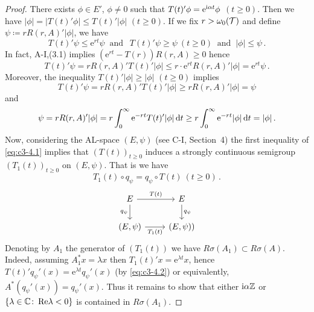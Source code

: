 \begin{proof}
	There exists $\phi \in E'$, $\phi \neq 0$ such that $T(t)'\phi = \mathrm{e}^{\mathrm{i}\alpha t}\phi$ $(t \geq 0)$. 
	Then we have $|\phi| = |T(t)'\phi| \leq T(t)'|\phi|$ $(t \geq 0)$.
	If we fix $r > \omega_0(\mathcal{T})$ and define $\psi \coloneqq  rR(r,A)'|\phi|$, we have
	\begin{equation}\label{eq:c3-4.1}
		T(t)'\psi \leq \mathrm{e}^{rt}\psi \ \text{ and } \ \ T(t)'\psi \geq \psi \ (t \geq 0) \ \text{ and } \ |\phi| \leq \psi\,.
	\end{equation}
	In fact, A-I,\;(3.1) implies $(\mathrm{e}^{rt} - T(r))R(r,A) \geq 0$ hence 
    \[
    T(t)'\psi = rR(r,A)'T(t)'|\phi| \leq r\cdot \mathrm{e}^{rt}R(r,A)'|\phi| = \mathrm{e}^{rt}\psi\,.
    \]
	Moreover, the inequality $T(t)'|\phi| \geq |\phi|$ $(t \geq 0)$ implies 
    \[
    T(t)'\psi = rR(r,A)'T(t)'|\phi| \geq rR(r,A)'|\phi| = \psi
    \]
    and 
    \[
    \psi = rR(r,A)'|\phi| = r \int_{0}^{\infty} \mathrm{e}^{-rt}T(t)'|\phi|\mathop{}\!\mathrm{d}{t}  \geq r\int_{0}^{\infty} \mathrm{e}^{-rt}|\phi|\mathop{}\!\mathrm{d}{t}  = |\phi|\,.
    \]
	Now, considering the AL-space $(E,\psi)$ (see C-I, Section~4) the first inequality of \eqref{eq:c3-4.1} implies that $(T(t))_{t \geq 0}$ induces a strongly continuous semigroup $(T_{1}(t))_{t \geq 0}$ on $(E,\psi)$.
	That is we have
	\begin{equation}\label{eq:c3-4.2}
    \textstyle
		T_{1}(t)\circ q_{\psi} = q_{\psi}\circ T(t) \ (t \geq 0)\,.
	\end{equation}
	\[
	\begin{tikzcd}
		E \arrow[r, "T(t)"] \arrow[d, "q_\psi"'] & E \arrow[d, "q_\psi"] \\
		(E,\psi) \arrow[r, "T_1(t)"'] & (E,\psi))
	\end{tikzcd}
	\]
	Denoting by $A_{1}$ the generator of $(T_{1}(t))$ we have $R\sigma(A_{1}) \subset R\sigma(A)$.
	Indeed, assuming $A_{1}^*x = \lambda x$ then $T_{1}(t)'x = \mathrm{e}^{\lambda t}x$, hence  $T(t)'q_{\psi}'(x) = \mathrm{e}^{\lambda t}q_{\psi}'(x)$ (by \eqref{eq:c3-4.2}) or equivalently, $A^*(q_{\psi}'(x)) = q_{\psi}'(x)$. 
	Thus it remains to show that either $\mathrm{i}\alpha\mathbb{Z}$ or $\{\lambda \in \mathbb{C}  \colon \mathop{}\!\mathrm{Re} \lambda < 0 \}$ is contained in $R\sigma(A_{1})$. 
	

\end{proof}
